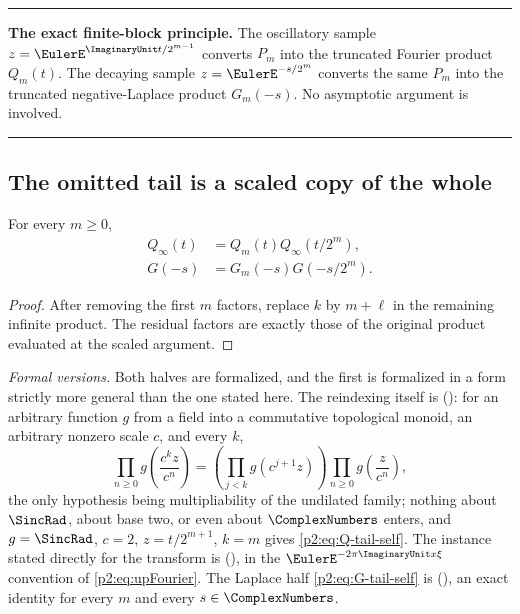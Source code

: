 \documentclass[11pt,oneside]{article}
\numberwithin{equation}{section}
\theoremstyle{definition}
\theoremstyle{remark}
\newenvironment{boxedremark}{%
  \par\smallskip\noindent\begin{center}\begin{minipage}{0.94\textwidth}%
  \color{black}\hrule\vspace{0.6em}\small
}{%
  \vspace{0.6em}\hrule\end{minipage}\end{center}\smallskip
}
\begin{document}
\begin{boxedremark}
\textbf{The exact finite-block principle.}
The oscillatory sample $z=\EulerE^{\ImaginaryUnit t/2^{m-1}}$ converts $P_m$ into the truncated Fourier
product $Q_m(t)$.  The decaying sample $z=\EulerE^{-s/2^m}$ converts the same $P_m$ into the
truncated negative-Laplace product $G_m(-s)$.  No asymptotic argument is involved.
\end{boxedremark}

\subsection{The omitted tail is a scaled copy of the whole}

\begin{proposition}
\label{p2:prop:tail-self}
For every $m\ge0$,
\begin{align}
 Q_\infty(t)&=Q_m(t)Q_\infty(t/2^m),
 \label{p2:eq:Q-tail-self}\\
 G(-s)&=G_m(-s)G(-s/2^m).
 \label{p2:eq:G-tail-self}
\end{align}
\newresult
\end{proposition}

\begin{proof}
After removing the first $m$ factors, replace $k$ by $m+\ell$ in the remaining infinite
product.  The residual factors are exactly those of the original product evaluated at the
scaled argument.
\end{proof}

\emph{Formal versions.}  Both halves are formalized, and the first is formalized in a form
strictly more general than the one stated here.  The reindexing itself is
 (): for an arbitrary
function $g$ from a field into a commutative topological monoid, an arbitrary nonzero scale
$c$, and every $k$,
\[
 \prod_{n\ge0}g\!\left(\frac{c^kz}{c^n}\right)
 =\left(\prod_{j<k}g\!\left(c^{j+1}z\right)\right)\prod_{n\ge0}g\!\left(\frac{z}{c^n}\right),
\]
the only hypothesis being multipliability of the undilated family; nothing about $\SincRad$,
about base two, or even about $\ComplexNumbers$ enters, and $g=\SincRad$, $c=2$, $z=t/2^{m+1}$, $k=m$ gives
\eqref{p2:eq:Q-tail-self}.  The instance stated directly for the transform is
 (), in the
$\EulerE^{-2\pi\ImaginaryUnit x\xi}$ convention of \eqref{p2:eq:upFourier}.  The Laplace half
\eqref{p2:eq:G-tail-self} is 
(), an exact identity for every $m$ and every $s\in\ComplexNumbers$.
\end{document}
